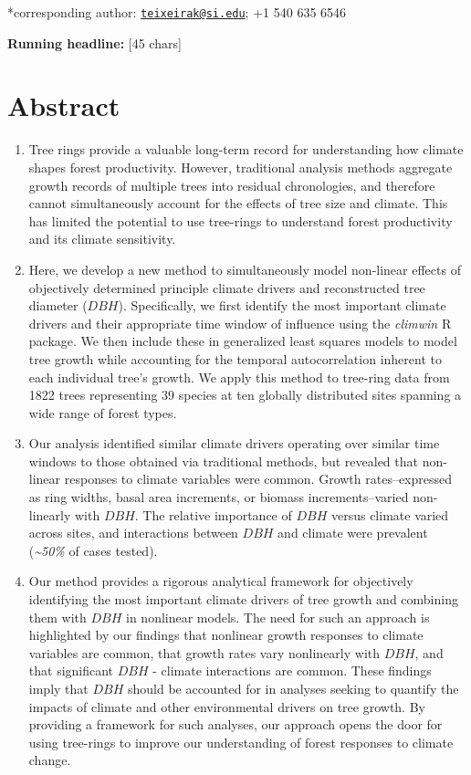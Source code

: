 \documentclass[
]{article}
\begin{document}
*corresponding author:
\href{mailto:teixeirak@si.edu}{\nolinkurl{teixeirak@si.edu}}; +1 540 635
6546

\textbf{Running headline:} {[}45 chars{]}

\newpage

\hypertarget{abstract}{%
\section{Abstract}\label{abstract}}

\begin{enumerate}
\def\labelenumi{\arabic{enumi}.}
\item
  Tree rings provide a valuable long-term record for understanding how
  climate shapes forest productivity. However, traditional analysis
  methods aggregate growth records of multiple trees into residual
  chronologies, and therefore cannot simultaneously account for the
  effects of tree size and climate. This has limited the potential to
  use tree-rings to understand forest productivity and its climate
  sensitivity.
\item
  Here, we develop a new method to simultaneously model non-linear
  effects of objectively determined principle climate drivers and
  reconstructed tree diameter (\(DBH\)). Specifically, we first identify
  the most important climate drivers and their appropriate time window
  of influence using the \emph{climwin} R package. We then include these
  in generalized least squares models to model tree growth while
  accounting for the temporal autocorrelation inherent to each
  individual tree's growth. We apply this method to tree-ring data from
  1822 trees representing 39 species at ten globally distributed sites
  spanning a wide range of forest types.
\item
  Our analysis identified similar climate drivers operating over similar
  time windows to those obtained via traditional methods, but revealed
  that non-linear responses to climate variables were common. Growth
  rates--expressed as ring widths, basal area increments, or biomass
  increments--varied non-linearly with \(DBH\). The relative importance
  of \(DBH\) versus climate varied across sites, and interactions
  between \(DBH\) and climate were prevalent (\emph{\textasciitilde50\%}
  of cases tested).
\item
  Our method provides a rigorous analytical framework for objectively
  identifying the most important climate drivers of tree growth and
  combining them with \(DBH\) in nonlinear models. The need for such an
  approach is highlighted by our findings that nonlinear growth
  responses to climate variables are common, that growth rates vary
  nonlinearly with \(DBH\), and that significant \(DBH\) - climate
  interactions are common. These findings imply that \(DBH\) should be
  accounted for in analyses seeking to quantify the impacts of climate
  and other environmental drivers on tree growth. By providing a
  framework for such analyses, our approach opens the door for using
  tree-rings to improve our understanding of forest responses to climate
  change.
\end{enumerate}
\end{document}
